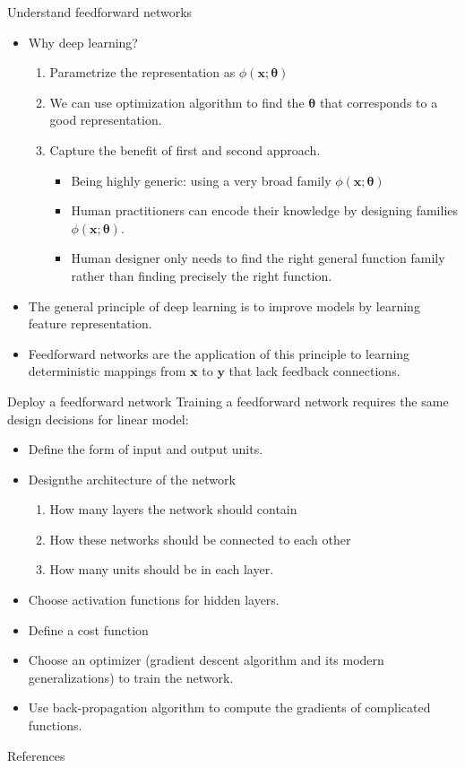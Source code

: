 \documentclass[10pt]{beamer}
\begin{document}
	\begin{frame}{Understand feedforward networks}
		\begin{itemize}
			\item Why deep learning?
			\begin{enumerate}
				\item Parametrize the representation as $\phi(\bm{x};\bm{\theta})$
				\item We can use optimization algorithm to find the $\bm{\theta}$ that corresponds to a good representation.
				\item Capture the benefit of first and second approach.
				\begin{itemize}
					\item Being highly generic: using a very broad family $\phi(\bm{x};\bm{\theta})$
					\item Human practitioners can encode their knowledge by designing families $\phi(\bm{x};\bm{\theta})$.
					\item Human designer only needs to find the right general function family rather than finding precisely the right function.
				\end{itemize}
			\end{enumerate}
			\item The general principle of deep learning is to improve models by learning feature representation.
			\item Feedforward networks are the application of this principle to learning deterministic mappings from $\bm{x}$ to $\bm{y}$ that lack feedback connections.
		\end{itemize}
	\end{frame}
	
	\begin{frame}{Deploy a feedforward network}
		Training a feedforward network requires the same design decisions for linear model:
		\begin{itemize}
			\item Define the form of input and output units.
			\item Designthe architecture of the network
			\begin{enumerate}
				\item How many layers the network should contain
				\item How these networks should be connected to each other
				\item How many units should be in each layer.
			\end{enumerate}
			\item Choose activation functions for hidden layers.
			\item Define a cost function
			\item Choose an optimizer (gradient descent algorithm and its modern generalizations) to train the network.
			\item Use back-propagation algorithm to compute the gradients of complicated functions.
		\end{itemize}
	\end{frame}


	\begin{frame}[allowframebreaks]{References}
		
		
	\end{frame}
\end{document}
